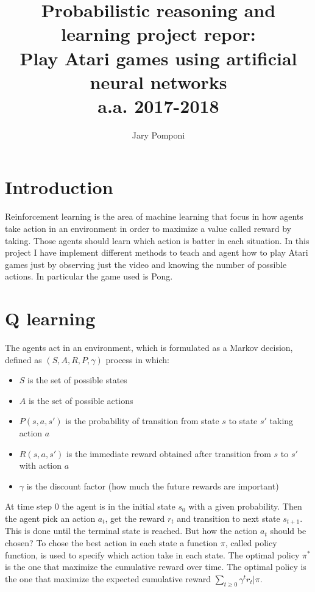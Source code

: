 \documentclass[10pt]{article}
\title{ 
	Probabilistic reasoning and learning project repor:  \protect\\ Play Atari games using artificial neural networks \protect\\  \large a.a. 2017-2018}
\author{ Jary Pomponi}
\date{\vspace{-5ex}}
\begin{document}
	\maketitle
\begin{multicols}{2}
\section{Introduction}
Reinforcement learning is the area of machine learning that focus in how agents take action in an environment in order to maximize a value called reward by taking. Those agents should learn which action is batter in each situation. In this project I have implement different methods to teach and agent how to play Atari games just by observing just the video and knowing the number of possible actions. In particular the game used is Pong. 

\section{Q learning}

The agents act in an environment, which is formulated as a Markov decision, defined as $(S, A, R, P, \gamma)$ process in which:
\begin{itemize}
	\item $S$ 	is the set of possible states
	\item $A$ is the set of possible actions
	\item $P(s, a, s')$ is the probability of transition from state $s$ to state $s'$ taking action $a$
	\item $R(s, a, s')$ is the immediate reward obtained after transition from $s$ to $s'$ with action $a$
	\item $\gamma$ is the discount factor (how much the future rewards are important)
\end{itemize}

At time step 0 the agent is in the initial state $s_0$ with a given probability. Then the agent pick an action $a_t$, get the reward $r_t$ and transition to next state $s_{t+1}$. This is done until the terminal state is reached. But how the action $a_t$ should be chosen? To chose the best action in each state a function $\pi$, called policy function, is used to specify which action take in each state. The optimal policy $\pi^*$ is the one that maximize the cumulative reward over time. The optimal policy is the one that maximize the expected cumulative reward $\sum_{t\ge0} \gamma^tr_t | \pi$. 


\end{multicols}
\end{document}
